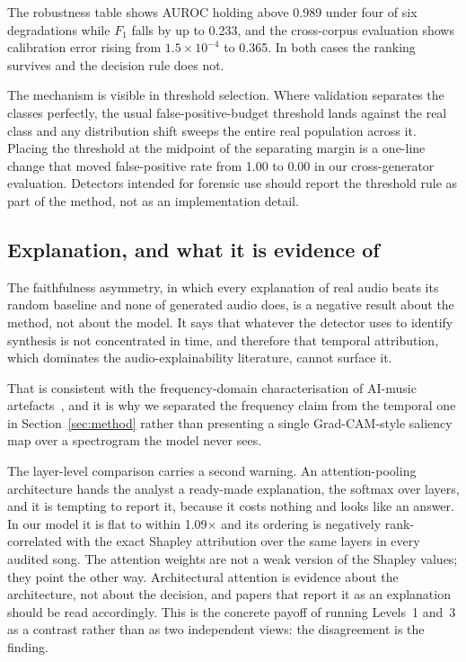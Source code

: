 The robustness table shows AUROC holding above 0.989 under four of six
degradations while $F_1$ falls by up to 0.233, and the cross-corpus evaluation
shows calibration error rising from $1.5\times10^{-4}$ to 0.365. In both cases
the ranking survives and the decision rule does not.

The mechanism is visible in threshold selection. Where validation separates the
classes perfectly, the usual false-positive-budget threshold lands against the
real class and any distribution shift sweeps the entire real population across
it. Placing the threshold at the midpoint of the separating margin is a one-line
change that moved false-positive rate from 1.00 to 0.00 in our cross-generator
evaluation. Detectors intended for forensic use should report the threshold rule
as part of the method, not as an implementation detail.

\subsection{Explanation, and what it is evidence of}

The faithfulness asymmetry, in which every explanation of real audio beats its
random baseline and none of generated audio does, is a negative result about the
method, not about the model. It says that whatever the detector uses to identify
synthesis is not concentrated in time, and therefore that temporal attribution,
which dominates the audio-explainability literature, cannot surface it.

That is consistent with the frequency-domain characterisation of AI-music
artefacts~\cite{afchar2025ismir}, and it is why we separated the frequency claim
from the temporal one in Section~\ref{sec:method} rather than presenting a
single Grad-CAM-style saliency map over a spectrogram the model never sees.

The layer-level comparison carries a second warning. An attention-pooling
architecture hands the analyst a ready-made explanation, the softmax over
layers, and it is tempting to report it, because it costs nothing and looks
like an answer. In our model it is flat to within 1.09$\times$ and its ordering
is negatively rank-correlated with the exact Shapley attribution over the same
layers in every audited song. The attention weights are not a weak version of
the Shapley values; they point the other way. Architectural attention is
evidence about the architecture, not about the decision, and papers that report
it as an explanation should be read accordingly. This is the concrete payoff of
running Levels~1 and~3 as a contrast rather than as two independent views: the
disagreement is the finding.
